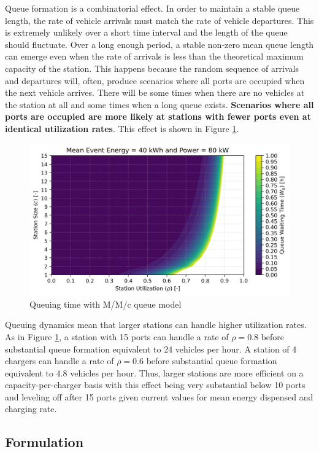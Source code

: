 Queue formation is a combinatorial effect. In order to maintain a stable queue length, the rate of vehicle arrivals must match the rate of vehicle departures. This is extremely unlikely over a short time interval and the length of the queue should fluctuate. Over a long enough period, a stable non-zero mean queue length can emerge even when the rate of arrivals is less than the theoretical maximum capacity of the station. This happens because the random sequence of arrivals and departures will, often, produce scenarios where all ports are occupied when the next vehicle arrives. There will be some times when there are no vehicles at the station at all and some times when a long queue exists. \textbf{Scenarios where all ports are occupied are more likely at stations with fewer ports even at identical utilization rates}. This effect is shown in Figure \ref{fig:queue}.

\begin{figure}[H]
	\centering
	\includegraphics[width = \linewidth]{./figures/formulation/queue.png}
	\caption{Queuing time with M/M/c queue model}
	\label{fig:queue}
\end{figure}

Queuing dynamics mean that larger stations can handle higher utilization rates. As in Figure \ref{fig:queue}, a station with 15 ports can handle a rate of $\rho = 0.8$ before substantial queue formation equivalent to 24 vehicles per hour. A station of 4 chargers can handle a rate of $\rho = 0.6$ before substantial queue formation equivalent to 4.8 vehicles per hour. Thus, larger stations are more efficient on a capacity-per-charger basis with this effect being very substantial below 10 ports and leveling off after 15 ports given current values for mean energy dispensed and charging rate.

\subsection{Formulation}

